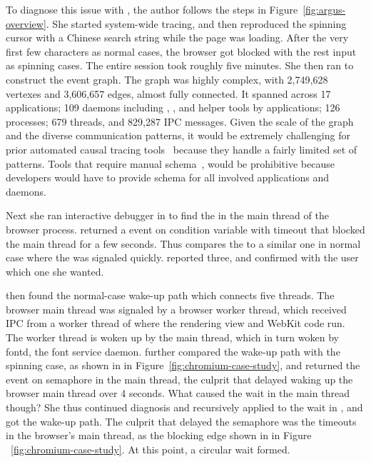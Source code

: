 
To diagnose this issue with \xxx, the author follows the steps in
Figure~\ref{fig:argus-overview}. She started system-wide tracing, and then
reproduced the spinning cursor with a Chinese search string while the page was
loading. After the very first few characters as normal cases, the browser got
blocked with the rest input as spinning cases. The entire session took roughly
five minutes.
She then ran \xxx to construct the event graph. The graph was highly complex,
with 2,749,628 vertexes and 3,606,657 edges, almost fully connected. It spanned
across 17 applications; 109 daemons including , ,
 and helper tools by applications; 126 processes; 679
threads, and 829,287 IPC messages. Given the scale of the graph and the diverse
communication patterns, it would be extremely challenging for prior automated
causal tracing tools~\cite{aguilera2003performance, zhang2013panappticon,
attariyan2012x, cohen2004correlating} because they handle a fairly limited
set of patterns. Tools that require manual schema~\cite{barham2004using,
reynolds2006pip}, would be prohibitive because developers would have to provide
schema for all involved applications and daemons.

Next she ran interactive debugger in \xxx to find the \spinningnode in the main
thread of the browser process. \xxx returned a  event on condition
variable with timeout that blocked the main thread for a few seconds. Thus \xxx
compares the \spinningnode to a similar one in normal case where the 
was signaled quickly. \xxx reported three, and confirmed with the user which one
she wanted.


\xxx then found the normal-case wake-up path which connects five threads.
The browser main thread was signaled by a browser worker thread, which
received IPC from a worker thread of  where the rendering view
and WebKit code run. The worker thread is woken up by the  main
thread, which in turn woken by fontd, the font service daemon. \xxx further
compared the wake-up path with the spinning case, as shown in 
in Figure~\ref{fig:chromium-case-study}, and returned the  event
on semaphore in the  main thread, the culprit that delayed
waking up the browser main thread over 4 seconds. What caused the wait in the
 main thread though? She thus continued diagnosis and recursively
applied \xxx to the wait in , and got the wake-up path. The culprit
that delayed the semaphore was the timeouts in the browser's main thread, as the
blocking edge shown in  in Figure ~\ref{fig:chromium-case-study}. At
this point, a circular wait formed.

